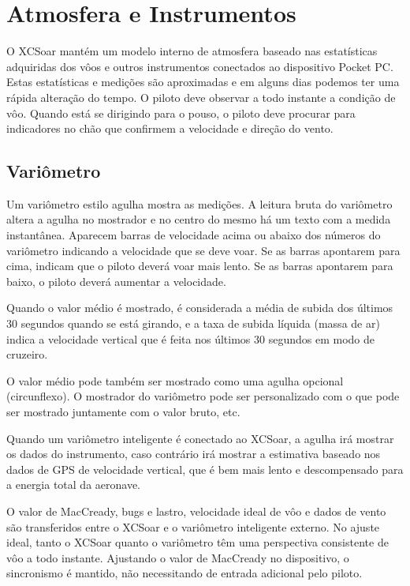 \chapter{Atmosfera e Instrumentos}\label{cha:atmosph}
O XCSoar mantém um modelo interno de atmosfera baseado nas estatísticas adquiridas dos vôos e outros instrumentos conectados ao dispositivo Pocket PC.  Estas estatísticas e medições são aproximadas e em alguns dias podemos ter uma rápida alteração do tempo.  O piloto deve observar a todo instante a condição de vôo.  Quando está se dirigindo para o pouso, o piloto deve procurar para indicadores no chão que confirmem a velocidade e direção do vento.

\section{Variômetro}\label{sec:variometer}

Um variômetro estilo agulha mostra as medições.  A leitura bruta do variômetro altera a agulha no mostrador e no centro do mesmo há um texto com a medida instantânea.  Aparecem barras de velocidade acima ou abaixo dos números do variômetro indicando a velocidade que se deve voar.  Se as barras apontarem para cima, indicam que o piloto deverá voar mais lento.  Se as barras apontarem para baixo, o piloto deverá aumentar a velocidade.

Quando o valor médio é mostrado, é considerada a média de subida dos últimos 30 segundos quando se está girando, e a taxa de subida líquida (massa de ar) indica a velocidade vertical que é feita nos últimos 30 segundos em modo de cruzeiro.



O valor médio pode também ser mostrado como uma agulha opcional (circunflexo).  O mostrador do variômetro pode ser personalizado  com o que pode ser mostrado juntamente com o valor bruto, etc.

Quando um variômetro inteligente é conectado ao XCSoar, a agulha irá mostrar os dados do instrumento, caso contrário irá mostrar a estimativa baseado nos dados de GPS de velocidade vertical, que é bem mais lento e descompensado para a energia total da aeronave.

O valor de MacCready, bugs e lastro, velocidade ideal de vôo e dados de vento são transferidos entre o XCSoar e o variômetro inteligente externo.  No ajuste ideal, tanto o XCSoar quanto o variômetro têm uma perspectiva consistente de vôo a todo instante.  Ajustando o valor de MacCready no dispositivo, o sincronismo é mantido, não necessitando de entrada adicional pelo piloto.

